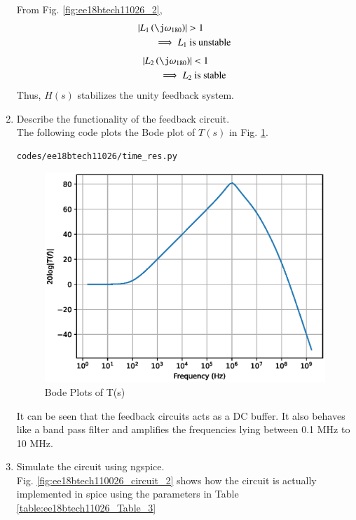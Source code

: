 \begin{enumerate}[label=\arabic*.,ref=\theenumi]
From Fig. \ref{fig:ee18btech11026_2},
\begin{align}
\abs{L_1\brak{\j\omega_{180}}} &> 1 
\\
\implies L_{1} &\text{ is unstable}
\end{align}
\begin{align}
\abs{L_2\brak{\j\omega_{180}}} & < 1 
\\
\implies L_{2} &\text{ is stable}
\end{align}
%
Thus, $H(s)$ stabilizes the unity feedback system.
\item Describe the functionality of the feedback circuit.
\\
\solution  
The following code plots the Bode plot of $T(s)$ in Fig. \ref{fig:ee18btech11026_bode}.
\begin{lstlisting}
codes/ee18btech11026/time_res.py
\end{lstlisting}
\begin{figure}[!h]
    \centering
    \includegraphics[width=\columnwidth]{./figs/ee18btech11026/Bodeplot.eps}
    \caption{Bode Plots of T(s)}
    \label{fig:ee18btech11026_bode}
\end{figure}
It can be seen that the feedback circuits acts as a DC buffer.  It also behaves like a band pass filter and amplifies the frequencies lying between 0.1 MHz to 10 MHz.
%
\item Simulate the circuit using ngspice.
%
\\
\solution Fig. \ref{fig:ee18btech110026_circuit_2} shows how the circuit is actually implemented in spice using the parameters in Table \ref{table:ee18btech11026_Table_3}  


\end{enumerate}
